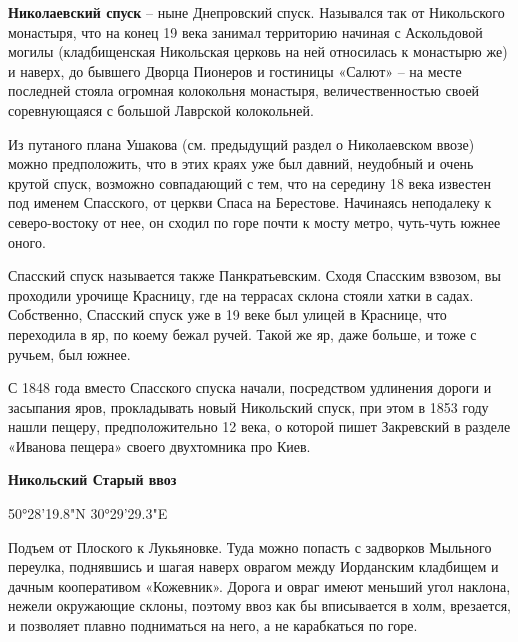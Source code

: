 \medskip





\textbf{Николаевский спуск} – ныне Днепровский спуск. Назывался так от Никольского монастыря, что на конец 19 века занимал территорию начиная с Аскольдовой могилы (кладбищенская Никольская церковь на ней относилась к монастырю же) и наверх, до бывшего Дворца Пионеров и гостиницы «Салют» – на месте последней стояла огромная колокольня монастыря, величественностью своей соревнующаяся с большой Лаврской колокольней.

Из путаного плана Ушакова (см. предыдущий раздел о Николаевском ввозе) можно предположить, что в этих краях уже был давний, неудобный и очень крутой спуск, возможно совпадающий с тем, что на середину 18 века известен под именем Спасского, от церкви Спаса на Берестове. Начинаясь неподалеку к северо-востоку от нее, он сходил по горе почти к мосту метро, чуть-чуть южнее оного. 

Спасский спуск называется также Панкратьевским. Сходя Спасским взвозом, вы проходили урочище Красницу, где на террасах склона стояли хатки в садах. Собственно, Спасский спуск уже в 19 веке был улицей в Краснице, что переходила в яр, по коему бежал ручей. Такой же яр, даже больше, и тоже с ручьем, был южнее.

С 1848 года вместо Спасского спуска начали, посредством удлинения дороги и засыпания яров, прокладывать новый Никольский спуск, при этом в 1853 году нашли пещеру, предположительно 12 века, о которой пишет Закревский в разделе «Иванова пещера» своего двухтомника про Киев.\\

\medskip


\textbf{Никольский Старый ввоз} 

50°28'19.8"N 30°29'29.3"E

Подъем от Плоского к Лукьяновке. Туда можно попасть с задворков Мыльного переулка, поднявшись и шагая наверх оврагом между Иорданским кладбищем и дачным кооперативом «Кожевник». Дорога и овраг имеют меньший угол наклона, нежели окружающие склоны, поэтому ввоз как бы вписывается в холм, врезается, и позволяет плавно подниматься на него, а не карабкаться по горе.

